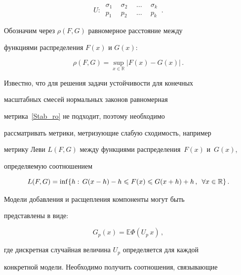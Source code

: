 \begin{equation}

\label{Stab_U} U:\

\begin{array}{cccc}

\sigma_1\ \ &\sigma_2\ \ &\ldots\ \ &\sigma_k\\[9pt]

p_1\ \ &p_2\ \ &\ldots\ \ &p_k

\end{array}\,.

\end{equation}



Обозначим  через $\rho(F,G)$ равномерное расстояние между

функциями распределения $F(x)$ и $G(x)$:

\begin{equation}

\label{Stab_ro}

\rho(F,G)=\sup\limits_{x\in{\mathbb R}}|F(x)-G(x)|\,.

\end{equation}



Известно, что для решения задачи устойчивости для конечных

масштабных смесей нормальных законов равномерная

метрика~\eqref{Stab_ro} не подходит, поэтому необходимо

рассматривать метрики, метризующие слабую сходимость, например

метрику Леви $L(F,G)$ между функциями распределения~$F(x)$ и~$G(x)$,

определяемую соотношением

$$

L(F,G)=\inf\{h:\, G(x-h)-h\leqslant F(x)\leqslant G(x+h)+h\,,\enskip \forall x\in{\mathbb R}\}\,.

$$



Модели добавления и расщепления компоненты могут быть

представлены в виде:

$$

G_p(x)={\mathbb E}\Phi(U_p\,x)\,,

$$

где дискретная случайная величина $U_p$ определяется для каждой

конкретной модели. Необходимо получить соотношения, связывающие


